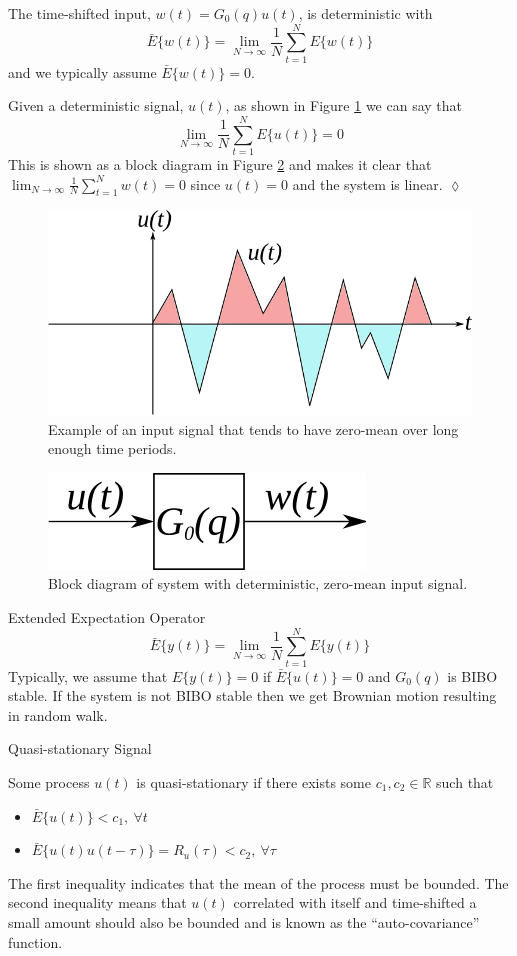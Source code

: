The time-shifted input, $w(t)=G_0(q)u(t)$, is deterministic with
$$\bar{E}\{w(t)\} = \lim_{N\to\infty}\frac{1}{N}\sum_{t=1}^NE\{w(t)\}$$
and we typically assume $\bar{E}\{w(t)\}=0$.

\begin{example}
Given a deterministic signal, $u(t)$, as shown in Figure \ref{fig:04inputSignal} we can say that
$$\lim_{N\to\infty}\frac{1}{N}\sum_{t=1}^NE\{u(t)\} = 0$$
This is shown as a block diagram in Figure \ref{fig:04detSignal} and makes it clear that $\lim_{N\to\infty}\frac{1}{N}\sum_{t=1}^Nw(t)=0$ since $u(t)=0$ and the system is linear.
$\lozenge$
\end{example}
\begin{figure}[ht!]
	\centering
	\includegraphics[width=.5\textwidth]{images/04inputSignal}
	\caption{Example of an input signal that tends to have zero-mean over long enough time periods.}
	\label{fig:04inputSignal}
\end{figure}

\begin{figure}[ht!]
	\centering
	\includegraphics[width=.3\textwidth]{images/04detSignal}
	\caption{Block diagram of system with deterministic, zero-mean input signal.}
	\label{fig:04detSignal}
\end{figure}

\begin{definition}{Extended Expectation Operator}
$$\bar{E}\{y(t)\}=\lim_{N\to\infty}\frac{1}{N}\sum_{t=1}^NE\{y(t)\}$$
Typically, we assume that $E\{y(t)\}=0$ if $\bar{E}\{u(t)\}=0$ and $G_0(q)$ is BIBO stable. If the system is not BIBO stable then we get Brownian motion resulting in random walk.
\end{definition}

\begin{definition}{Quasi-stationary Signal}

\label{def:quasistationary}
Some process $u(t)$ is quasi-stationary if there exists some $c_1, c_2 \in\mathbb{R}$ such that
\begin{itemize}
\item $\bar{E}\{u(t)\} < c_1, ~\forall t$
\item $\bar{E}\{u(t)u(t-\tau)\} = R_u(\tau) < c_2, ~\forall \tau$
\end{itemize}
The first inequality indicates that the mean of the process must be bounded. The second inequality means that $u(t)$ correlated with itself and time-shifted a small amount should also be bounded and is known as the ``auto-covariance'' function.
\end{definition}

